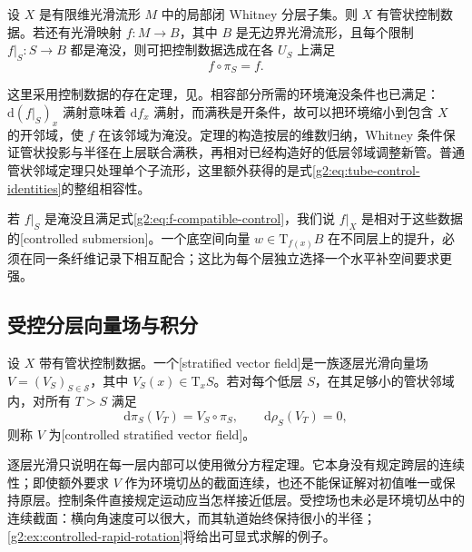 \begin{theorem}\label{g2:thm:compatible-control-data}
	设 \(X\) 是有限维光滑流形 \(M\) 中的局部闭 Whitney 分层子集。则 \(X\) 有管状控制数据。若还有光滑映射 \(f:M\to B\)，其中 \(B\) 是无边界光滑流形，且每个限制 \(f|_S:S\to B\) 都是淹没，则可把控制数据选成在各 \(U_S\) 上满足
	\begin{equation}\label{g2:eq:f-compatible-control}
		f\circ\pi_S=f.
	\end{equation}
\end{theorem}

这里采用控制数据的存在定理，见\cite[第7节]{Mather2012TopologicalStability}。相容部分所需的环境淹没条件也已满足：\(\mathrm{d}(f|_S)_x\) 满射意味着 \(\mathrm{d}f_x\) 满射，而满秩是开条件，故可以把环境缩小到包含 \(X\) 的开邻域，使 \(f\) 在该邻域为淹没。定理的构造按层的维数归纳，Whitney 条件保证管状投影与半径在上层联合满秩，再相对已经构造好的低层邻域调整新管。普通管状邻域定理只处理单个子流形，这里额外获得的是式\eqref{g2:eq:tube-control-identities}的整组相容性。

\ProseParagraphBreak

若 \(f|_S\) 是淹没且满足式\eqref{g2:eq:f-compatible-control}，我们说 \(f|_X\) 是相对于这些数据的[controlled submersion]。一个底空间向量 \(w\in\mathrm{T}_{f(x)}B\) 在不同层上的提升，必须在同一条纤维记录下相互配合；这比为每个层独立选择一个水平补空间要求更强。

\subsection{受控分层向量场与积分}
\label{g2:subsec:B02:02}

\begin{definition}\label{g2:def:controlled-stratified-vector-field}
	设 \(X\) 带有管状控制数据。一个[stratified vector field]是一族逐层光滑向量场 \(V=(V_S)_{S\in\mathcal S}\)，其中 \(V_S(x)\in\mathrm{T}_xS\)。若对每个低层 \(S\)，在其足够小的管状邻域内，对所有 \(T>S\) 满足
	\begin{equation}\label{g2:eq:controlled-vector-field}
		\mathrm{d}\pi_S(V_T)=V_S\circ\pi_S,
		\qquad \mathrm{d}\rho_S(V_T)=0,
	\end{equation}
	则称 \(V\) 为[controlled stratified vector field]。
\end{definition}

逐层光滑只说明在每一层内部可以使用微分方程定理。它本身没有规定跨层的连续性；即使额外要求 \(V\) 作为环境切丛的截面连续，也还不能保证解对初值唯一或保持原层。控制条件直接规定运动应当怎样接近低层。受控场也未必是环境切丛中的连续截面：横向角速度可以很大，而其轨道始终保持很小的半径；\cref{g2:ex:controlled-rapid-rotation}将给出可显式求解的例子。

